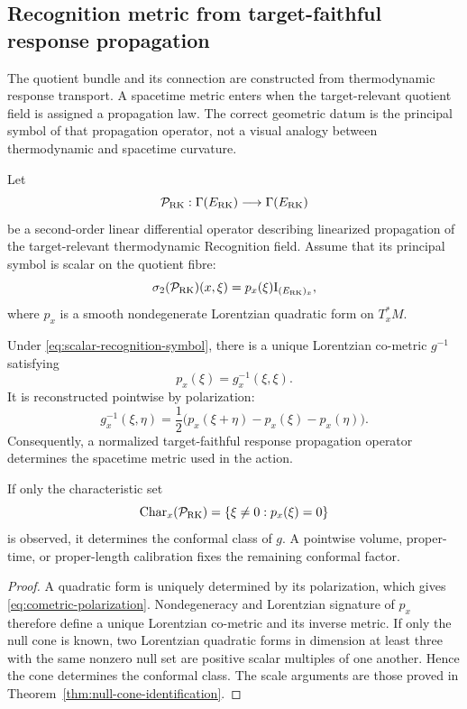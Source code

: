 \subsection{Recognition metric from target-faithful response propagation}
\label{sec:recognition-metric-propagation}

The quotient bundle and its connection are constructed from thermodynamic response transport.  A spacetime metric enters when the target-relevant quotient field is assigned a propagation law.  The correct geometric datum is the principal symbol of that propagation operator, not a visual analogy between thermodynamic and spacetime curvature.

Let
\[
\mathcal P_{\mathrm{RK}}:\Gamma(E_{\mathrm{RK}})\longrightarrow\Gamma(E_{\mathrm{RK}})
\]
be a second-order linear differential operator describing linearized propagation of the target-relevant thermodynamic Recognition field.  Assume that its principal symbol is scalar on the quotient fibre:
\begin{equation}
\sigma_2(\mathcal P_{\mathrm{RK}})(x,\xi)
=p_x(\xi)\mathrm I_{(E_{\mathrm{RK}})_x},
\label{eq:scalar-recognition-symbol}
\end{equation}
where $p_x$ is a smooth nondegenerate Lorentzian quadratic form on $T_x^*M$.

\begin{theorem}
\label{thm:principal-symbol-recognition-metric}
Under \eqref{eq:scalar-recognition-symbol}, there is a unique Lorentzian co-metric $g^{-1}$ satisfying
\begin{equation}
p_x(\xi)=g_x^{-1}(\xi,\xi).
\label{eq:recognition-cometric-symbol}
\end{equation}
It is reconstructed pointwise by polarization:
\begin{equation}
g_x^{-1}(\xi,\eta)
=
\frac12\bigl(
 p_x(\xi+\eta)-p_x(\xi)-p_x(\eta)
\bigr).
\label{eq:cometric-polarization}
\end{equation}
Consequently, a normalized target-faithful response propagation operator determines the spacetime metric used in the action.

If only the characteristic set
\[
\operatorname{Char}_x(\mathcal P_{\mathrm{RK}})
=\{\xi\ne0:p_x(\xi)=0\}
\]
is observed, it determines the conformal class of $g$.  A pointwise volume, proper-time, or proper-length calibration fixes the remaining conformal factor.
\end{theorem}

\begin{proof}
A quadratic form is uniquely determined by its polarization, which gives \eqref{eq:cometric-polarization}.  Nondegeneracy and Lorentzian signature of $p_x$ therefore define a unique Lorentzian co-metric and its inverse metric.  If only the null cone is known, two Lorentzian quadratic forms in dimension at least three with the same nonzero null set are positive scalar multiples of one another.  Hence the cone determines the conformal class.  The scale arguments are those proved in Theorem~\ref{thm:null-cone-identification}.
\end{proof}

